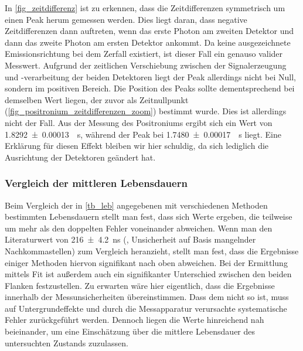 \documentclass[
	a4paper,
	12pt,
	pagesize,
	ngerman
]{scrartcl}
\begin{document}
	In \cref{fig_zeitdifferenz} ist zu erkennen, dass die Zeitdifferenzen symmetrisch um einen Peak herum gemessen werden.
	Dies liegt daran, dass negative Zeitdifferenzen dann auftreten, wenn das erste Photon am zweiten Detektor und dann das zweite Photon am ersten Detektor ankommt.
	Da keine ausgezeichnete Emissionsrichtung bei dem Zerfall existiert, ist dieser Fall ein genauso valider Messwert.
	Aufgrund der zeitlichen Verschiebung zwischen der Signalerzeugung und -verarbeitung der beiden Detektoren liegt der Peak allerdings nicht bei Null, sondern im positiven Bereich.
	Die Position des Peaks sollte dementsprechend bei demselben Wert liegen, der zuvor als Zeitnullpunkt (\cref{fig_positronium_zeitdifferenzen_zoom}) bestimmt wurde.
	Dies ist allerdings nicht der Fall.
	Aus der Messung des Positroniums ergibt sich ein Wert von \SI{1,8292+-0.00013}{\mu s}, während der Peak bei \SI{1,7480+-0.00017}{\mu s} liegt.
	Eine Erklärung für diesen Effekt bleiben wir hier schuldig, da sich lediglich die Ausrichtung der Detektoren geändert hat.


	\subsubsection{Vergleich der mittleren Lebensdauern}
	Beim Vergleich der in \cref{tb_leb} angegebenen mit verschiedenen Methoden bestimmten Lebensdauern stellt man fest, dass sich Werte ergeben, die teilweise um mehr als den doppelten Fehler voneinander abweichen.
	Wenn man den Literaturwert von \SI{216 \pm 4,2}{\nano s} (\cite{Anleitung}, Unsicherheit auf Basis mangelnder Nachkommastellen) zum Vergleich heranzieht, stellt man fest, dass die Ergebnisse einiger Methoden hiervon signifikant nach oben abweichen.
	Bei der Ermittlung mittels Fit ist außerdem auch ein signifikanter Unterschied zwischen den beiden Flanken festzustellen.
	Zu erwarten wäre hier eigentlich, dass die Ergebnisse innerhalb der Messunsicherheiten übereinstimmen.
	Dass dem nicht so ist, muss auf Untergrundeffekte und durch die Messapparatur verursachte systematische Fehler zurückgeführt werden.
	Dennoch liegen die Werte hinreichend nah beieinander, um eine Einschätzung über die mittlere Lebensdauer des untersuchten Zustands zuzulassen.
\end{document}
